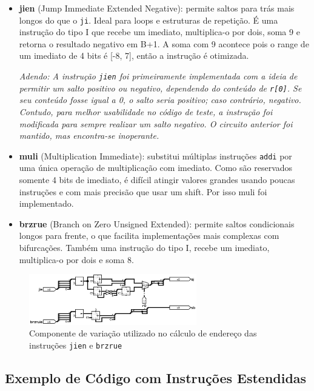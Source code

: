 \documentclass[12pt]{article}
\begin{document}
\begin{itemize}
  \item \textbf{jien} (Jump Immediate Extended Negative): permite saltos para trás mais longos do que o \texttt{ji}. Ideal para loops e estruturas de repetição. É uma instrução do tipo I que recebe um imediato, multiplica-o por dois, soma 9 e retorna o resultado negativo em B+1. A soma com 9 acontece pois o range de um imediato de 4 bits é [-8, 7], então a instrução é otimizada.

  \textit{Adendo: A instrução \texttt{jien} foi primeiramente implementada com a ideia de permitir um salto positivo ou negativo, dependendo do conteúdo de \texttt{r[0]}. Se seu conteúdo fosse igual a 0, o salto seria positivo; caso contrário, negativo. Contudo, para melhor usabilidade no código de teste, a instrução foi modificada para sempre realizar um salto negativo. O circuito anterior foi mantido, mas encontra-se inoperante.}

  \item \textbf{muli} (Multiplication Immediate): substitui múltiplas instruções \texttt{addi} por uma única operação de multiplicação com imediato. Como são reservados somente 4 bits de imediato, é difícil atingir valores grandes usando poucas instruções e com mais precisão que usar um shift. Por isso muli foi implementado.
  \item \textbf{brzrue} (Branch on Zero Unsigned Extended): permite saltos condicionais longos para frente, o que facilita implementações mais complexas com bifurcações. Também uma instrução do tipo I, recebe um imediato, multiplica-o por dois e soma 8.
\end{itemize}

\begin{figure}[H]
\centering
\includegraphics[width=0.65\textwidth]{images/variation_component.png}
\caption{Componente de variação utilizado no cálculo de endereço das instruções \texttt{jien} e \texttt{brzrue}}
\label{fig:variation}
\end{figure}

\subsection{Exemplo de Código com Instruções Estendidas}
\end{document}
